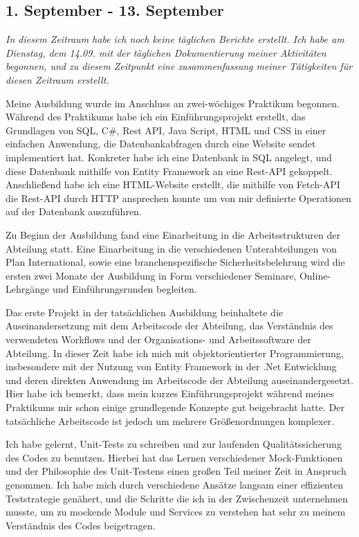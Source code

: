 \subsection{1. September - 13. September}
\textit{In diesem Zeitraum habe ich noch keine täglichen Berichte erstellt. Ich habe am Dienstag, dem 14.09. mit der täglichen Dokumentierung meiner Aktivitäten begonnen, und zu diesem Zeitpunkt eine zusammenfassung meiner Tätigkeiten für diesen Zeitraum erstellt.}

 Meine Ausbildung wurde im Anschluss an zwei-wöchiges Praktikum begonnen. Während des Praktikums habe ich ein Einführungsprojekt erstellt, das Grundlagen von SQL, C$\#$, Rest API, Java Script, HTML und CSS in einer einfachen Anwendung, die Datenbankabfragen durch eine Website sendet implementiert hat. Konkreter habe ich eine Datenbank in SQL angelegt, und diese Datenbank mithilfe von Entity Framework an eine Rest-API gekoppelt. Anschließend habe ich eine HTML-Website erstellt, die mithilfe von Fetch-API die Rest-API durch HTTP ansprechen konnte um von mir definierte Operationen auf der Datenbank auszuführen.

Zu Beginn der Ausbildung fand eine Einarbeitung in die Arbeitsstrukturen der Abteilung statt. Eine Einarbeitung in die verschiedenen Unterabteilungen von Plan International, sowie eine branchenspezifische Sicherheitsbelehrung wird die ersten zwei Monate der Ausbildung in Form verschiedener Seminare, Online-Lehrgänge und Einführungsrunden begleiten.

Das erste Projekt in der tatsächlichen Ausbildung beinhaltete die Auseinandersetzung mit dem Arbeitscode der Abteilung, das Verständnis des verwendeten Workflows und der Organisations- und Arbeitssoftware der Abteilung. In dieser Zeit habe ich mich mit objektorientierter Programmierung, insbesondere mit der Nutzung von Entity Framework in der .Net Entwicklung und deren direkten Anwendung im Arbeitscode der Abteilung auseinandergesetzt. Hier habe ich bemerkt, dass mein kurzes Einführungsprojekt während meines Praktikums mir schon einige grundlegende Konzepte gut beigebracht hatte. Der tatsächliche Arbeitscode ist jedoch um mehrere Größenordnungen komplexer.

Ich habe gelernt, Unit-Tests zu schreiben und zur laufenden Qualitätssicherung des Codes zu benutzen. Hierbei hat das Lernen verschiedener Mock-Funktionen und der Philosophie des Unit-Testens einen großen Teil meiner Zeit in Anspruch genommen. Ich habe mich durch verschiedene Ansätze langsam einer effizienten Teststrategie genähert, und die Schritte die ich in der Zwischenzeit unternehmen musste, um zu mockende Module und Services zu verstehen hat sehr zu meinem Verständnis des Codes beigetragen.


